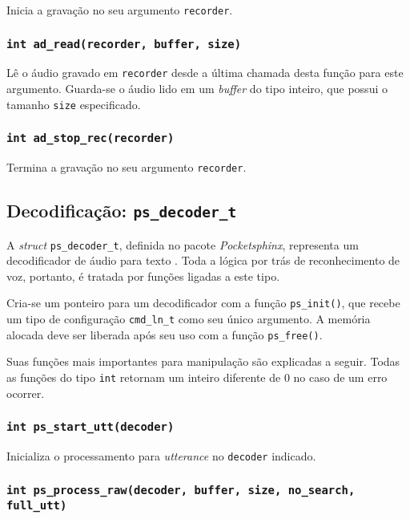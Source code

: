 Inicia a gravação no seu argumento \texttt{recorder}.

\subsubsection{\texttt{int ad\_read(recorder, buffer, size)}}

Lê o áudio gravado em \texttt{recorder} desde a última chamada desta função para este argumento. Guarda-se o áudio lido em um \textit{buffer} do tipo inteiro, que possui o tamanho \texttt{size} especificado.

\subsubsection{\texttt{int ad\_stop\_rec(recorder)}}

Termina a gravação no seu argumento \texttt{recorder}.


\subsection{Decodificação: \texttt{ps\_decoder\_t}}

A \textit{struct} \texttt{ps\_decoder\_t}, definida no pacote \textit{Pocketsphinx}, representa um decodificador de áudio para texto \citep{pocketsphinxInstallUse}. Toda a lógica por trás de reconhecimento de voz, portanto, é tratada por funções ligadas a este tipo.

Cria-se um ponteiro para um decodificador com a função \texttt{ps\_init()}, que recebe um tipo de configuração \texttt{cmd\_ln\_t} como seu único argumento. A memória alocada deve ser liberada após seu uso com a função \texttt{ps\_free()}.

Suas funções mais importantes para manipulação são explicadas a seguir. Todas as funções do tipo \texttt{int} retornam um inteiro diferente de 0 no caso de um erro ocorrer.

\subsubsection{\texttt{int ps\_start\_utt(decoder)}}

Inicializa o processamento para \textit{utterance} no \texttt{decoder} indicado.

\subsubsection{\texttt{int ps\_process\_raw(decoder, buffer, size, no\_search, full\_utt)}}

